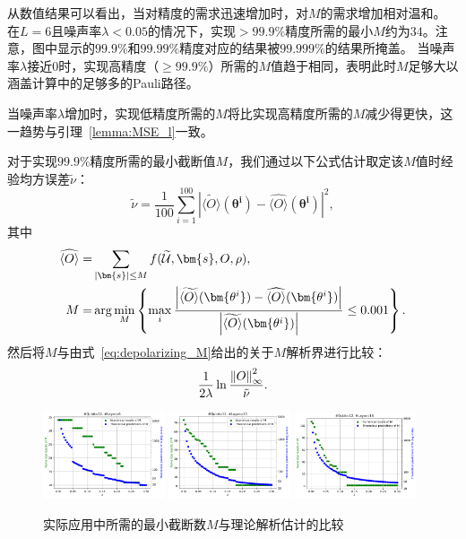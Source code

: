 从数值结果可以看出，当对精度的需求迅速增加时，对$M$的需求增加相对温和。
在$L=6$且噪声率$\lambda<0.05$的情况下，实现$>99.9\%$精度所需的最小$M$约为$34$。注意，图中显示的$99.9\%$和$99.99\%$精度对应的结果被$99.999\%$的结果所掩盖。
当噪声率$\lambda$接近$0$时，实现高精度（$\geq 99.9\%$）所需的$M$值趋于相同，表明此时$M$足够大以涵盖计算中的足够多的Pauli路径。

当噪声率$\lambda$增加时，实现低精度所需的$M$将比实现高精度所需的$M$减少得更快，这一趋势与引理~\ref{lemma:MSE_l}一致。

对于实现$99.9\%$精度所需的最小截断值$M$，我们通过以下公式估计取定该$M$值时经验均方误差$\tilde{\nu}$：
\begin{equation}\label{ap:eq:emse}
    \tilde{\nu} = \frac{1}{100}\sum_{i=1}^{100}\left|\widetilde{\langle O \rangle}(\bm{\theta^i}) - \widehat{\langle O \rangle}(\bm{\theta^i})\right|^2,
\end{equation}
其中
\begin{equation}
    \begin{aligned}
        \widehat{\langle O \rangle}=&\sum_{\abs{\bm{s}}\leq M}f(\widetilde{\mathcal{U}},\bm{s},O,\rho),\\
        M=&\arg\min_{M} \left\{ \max_{i} \frac{\left|\widetilde{\langle O \rangle}(\bm{\theta^i}) - \widehat{\langle O \rangle}(\bm{\theta^i})\right|}{\left|\widetilde{\langle O \rangle}(\bm{\theta^i})\right|} \leq 0.001 \right\}.
    \end{aligned}
\end{equation}
然后将$M$与由式~\ref{eq:depolarizing_M}给出的关于$M$解析界进行比较：
\begin{equation}\label{ap:eq:analytical_bound}
  \frac{1}{2\lambda}\ln{\frac{\norm{O}_\infty^2}{\tilde{\nu}}}.
\end{equation}

\begin{figure}[htbp]
    \centering
    \includegraphics[width=0.32\textwidth]{figures/complexity2/12_1}
    \includegraphics[width=0.32\textwidth]{figures/complexity2/12_2}
    \includegraphics[width=0.32\textwidth]{figures/complexity2/12_3}
    \caption{
        实际应用中所需的最小截断数$M$与理论解析估计的比较}\label{fig:numerical_M2}
\end{figure}

